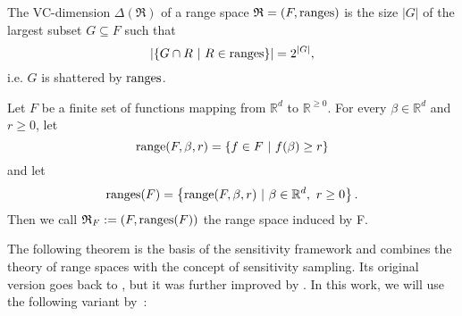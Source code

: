 \begin{definition}
    The VC-dimension $\Delta(\mathfrak{R})$ of a range space
    $\mathfrak{R} = (F, \textup{ranges})$ is
    the size $|G|$ of the largest subset $G \subseteq F$ such that
    \begin{equation*}
        \left| \left\{ G \cap R \ | \ R \in \textup{ranges} \right\} \right|
        = 2^{|G|},
    \end{equation*}
    i.e. $G$ is shattered by $\textup{ranges}$.
\end{definition}

\begin{definition}
    Let $F$ be a finite set of functions mapping from $\mathbb{R}^d$ to $\mathbb{R}^{\geq 0}$.
    For every $\beta \in \mathbb{R}^d$ and $r \geq 0$, let
    \begin{equation*}
        \textup{range}(F, \beta, r) = \left\{ f \in F \ | \  f(\beta) \geq r  \right\}
    \end{equation*}
    and let
    \begin{equation*}
        \textup{ranges}(F) = \left\{ \textup{range}(F, \beta, r) \ | \ \beta \in \mathbb{R}^d, \ r \geq 0  \right\}.
    \end{equation*}
    Then we call $\mathfrak{R}_F := (F, \textup{ranges}(F))$ the range space induced by F.
\end{definition}

The following theorem is the basis of the sensitivity framework and
combines the theory of range spaces with the concept of
sensitivity sampling. Its original version goes back to
\cite{feldman-langberg-coresets}, but it was
further improved by
\cite{braverman-feldman-coresets}.
In this work, we will use the following variant by~\cite{big-data-tiny-data}:

